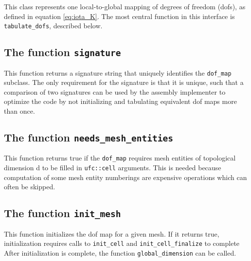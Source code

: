 This class represents one local-to-global mapping of degrees of freedom (dofs),
as defined in equation \eqref{eq:iota_K}.
The most central function in this interface is \texttt{tabulate\_dofs}, described below.






\subsection{The function \texttt{signature}}
This function returns a signature string that uniquely identifies the \texttt{dof\_map} subclass.
The only requirement for the signature is that it is unique, such
that a comparison of two signatures can be used by the assembly
implementer to optimize the code by not initializing and tabulating equivalent dof maps more than once.


\subsection{The function \texttt{needs\_mesh\_entities}}
This function returns true if the \texttt{dof\_map} requires mesh entities
of topological dimension d to be filled in \texttt{ufc::cell} arguments.
This is needed because computation of some mesh entity numberings
are expensive operations which can often be skipped.


\subsection{The function \texttt{init\_mesh}}
This function initializes the dof map for a given mesh.
If it returns true, initialization requires calls to \texttt{init\_cell} and \texttt{init\_cell\_finalize} to complete
After initialization is complete, the function \texttt{global\_dimension} can be called.

